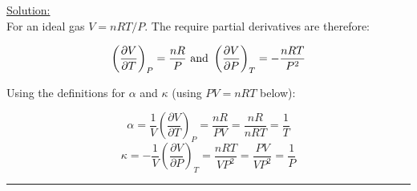 \noindent
\underline{Solution:}\\

For an ideal gas $V = nRT / P$. The require partial derivatives are therefore:

$$\left(\frac{\partial V}{\partial T}\right)_P = \frac{nR}{P} \textnormal{ and }\left(\frac{\partial V}{\partial P}\right)_T = -\frac{nRT}{P^2}$$

Using the definitions for $\alpha$ and $\kappa$ (using $PV = nRT$ below):

$$\alpha = \frac{1}{V}\left(\frac{\partial V}{\partial T}\right)_P = \frac{nR}{PV} = \frac{nR}{nRT} = \frac{1}{T}$$
$$\kappa = -\frac{1}{V}\left(\frac{\partial V}{\partial P}\right)_T = \frac{nRT}{VP^2} = \frac{PV}{VP^2} = \frac{1}{P}$$

\hrule\vspace{0.5cm}
